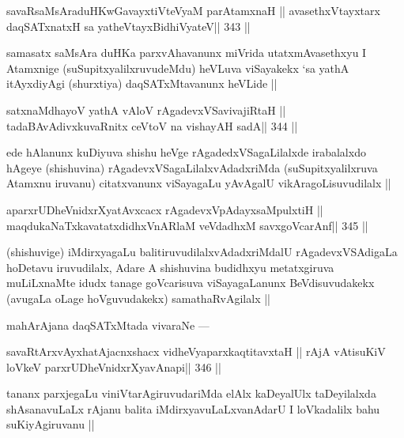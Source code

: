 \begin{shl}
savaRsaMsAraduHKwGavayxtiVteVyaM parA\s\s tamxnaH ||
avasethxVtayxtarx daqSATxnatxH sa yatheVtayxBidhiVyateV\hfill || 343 ||
\end{shl}

\begin{artha}
samasatx saMsAra duHKa parxvAhavanunx miVrida utatxmAvasethxyu I Atamxnige (suSupitxyalilxruvudeMdu) heVLuva viSayakekx `sa yathA itAyxdiyAgi (shurxtiya) daqSATxMtavanunx heVLide ||
\end{artha}

\begin{shl}
satxnaMdhayoV yathA vAloV rAgadevxVSavivajiRtaH ||
tadaBAvAdivxkuvaRnitx ceVtoV na vishayAH sadA\hfill || 344 ||
\end{shl}

\begin{artha}
ede hAlanunx kuDiyuva shishu heVge rAgadedxVSagaLilalxde irabalalxdo hAgeye (shishuvina) rAgadevxVSagaLilalxvAdadxriMda (suSupitxyalilxruva Atamxnu iruvanu) citatxvanunx viSayagaLu yAvAgalU vikAragoLisuvudilalx ||
\end{artha}

\begin{shl}
aparxrUDheVnidxrXyatAvxcacx rAgadevxVpAdayxsaMpulxtiH ||
maqdukaNaTxkavatatxdidhxVnARlaM veVdadhxM savxgoVcarAnf\hfill || 345 ||
\end{shl}

\begin{artha}
(shishuvige) iMdirxyagaLu balitiruvudilalxvAdadxriMdalU rAgadevxVSAdigaLa hoDetavu iruvudilalx, Adare A shishuvina budidhxyu metatxgiruva muLiLxnaMte idudx tanage goVcarisuva viSayagaLanunx BeVdisuvudakekx (avugaLa oLage hoVguvudakekx) samathaRvAgilalx ||
\end{artha}

\begin{artha}
mahArAjana daqSATxMtada vivaraNe ---
\end{artha}

\begin{shl}
savaRtArxvAyxhatAjacnxshacx vidheVyaparxkaqtitavxtaH ||
rAjA vA\s tisuKiV loVkeV parxrUDheVnidxrXyavAnapi\hfill || 346 ||
\end{shl}

\begin{artha}
tananx parxjegaLu viniVtarAgiruvudariMda elAlx kaDeyalUlx taDeyilalxda shAsanavuLaLx rAjanu balita iMdirxyavuLaLxvanAdarU I loVkadalilx bahu suKiyAgiruvanu ||
\end{artha}

